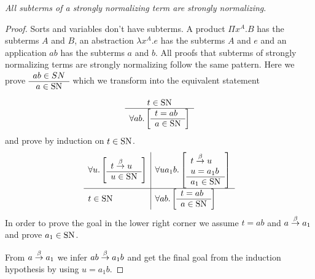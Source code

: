 \begin{theorem}
    \label{StronglyNormalizingSubterm}
    \emph{All subterms of a strongly normalizing term are strongly normalizing}.
    \begin{proof} Sorts and variables don't have subterms. A product $\Pi
        x^A.B$ has the subterms $A$ and $B$, an abstraction $\lambda x^A.e$ has
        the subterms $A$ and $e$ and an application $ab$ has the subterms $a$
        and $b$. All proofs that subterms of strongly normalizing terms are
        strongly normalizing follow the same pattern. Here we prove $\begin{array}{c} ab
        \in SN \\ \hline a \in \text{SN}\end{array}$ which we transform into the equivalent statement
        $$
        \begin{array}{c} 
            t \in \text{SN}
         \\ \hline 
            \forall ab. \left[ \begin{array}{l} t = ab \\ \hline a \in \text{SN}\end{array} \right]
        \end{array}
        $$
        and prove by induction on $t \in \text{SN}$.
        $$
        \begin{array}{l|l} \forall u. \left[ \begin{array}{l} t \stackrel{\beta}{\to} u \\ \hline u \in \text{SN}\end{array} \right] & \forall u a_1 b. \left[ \begin{array}{l} t \stackrel{\beta}{\to} u \\ u = a_1 b \\ \hline a_1 \in \text{SN}\end{array} \right] \\ \hline t \in \text{SN} & \forall ab. \left[ \begin{array}{l} t = ab \\ \hline a \in \text{SN}\end{array} \right] \end{array}
        $$
        In order to prove the goal in the lower right corner we assume $t = ab$
        and $a \stackrel{\beta}{\to} a_1$ and prove $a_1 \in \text{SN}$.

        From $a \stackrel{\beta}{\to} a_1$ we infer $ab \stackrel{\beta}{\to} a_1 b$ and get the final goal
        from the induction hypothesis by using $u = a_1 b$.
    \end{proof}
\end{theorem}






